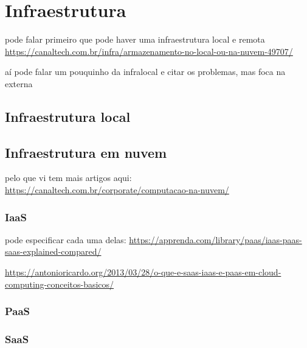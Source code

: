 \chapter{Infraestrutura}

pode falar primeiro que pode haver uma infraestrutura local e remota
\url{https://canaltech.com.br/infra/armazenamento-no-local-ou-na-nuvem-49707/}

aí pode falar um pouquinho da infralocal e citar os problemas,
mas foca na externa

\section{Infraestrutura local}

\section{Infraestrutura em nuvem}

pelo que vi tem mais artigos aqui: \url{https://canaltech.com.br/corporate/computacao-na-nuvem/}

\subsection{IaaS}

pode especificar cada uma delas:
\url{https://apprenda.com/library/paas/iaas-paas-saas-explained-compared/}

\url{https://antonioricardo.org/2013/03/28/o-que-e-saas-iaas-e-paas-em-cloud-computing-conceitos-basicos/}

\subsection{PaaS}

\subsection{SaaS}
